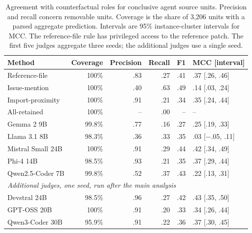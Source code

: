 \documentclass[a4paper,fleqn]{cas-sc}
\begin{document}
\begin{table}[pos=htbp]
\caption{Agreement with counterfactual roles for conclusive agent source units. Precision and recall concern removable units. Coverage is the share of 3,206 units with a parsed aggregate prediction. Intervals are 95\% instance-cluster intervals for MCC. The reference-file rule has privileged access to the reference patch. The first five judges aggregate three seeds; the additional judges use a single seed.}
\label{tab:comparisons}
\centering\small
\begin{tabular}{lrrrrl}
\toprule
Method & Coverage & Precision & Recall & F1 & MCC [interval] \\
\midrule
Reference-file & 100\% & .83 & .27 & .41 & .37 [.26, .46] \\
Issue-mention & 100\% & .40 & .63 & .49 & .14 [.03, .24] \\
Import-proximity & 100\% & .91 & .21 & .34 & .35 [.24, .44] \\
All-retained & 100\% & -- & .00 & -- & -- \\
\midrule
Gemma 2 9B & 99.8\% & .77 & .16 & .27 & .25 [.19, .33] \\
Llama 3.1 8B & 98.3\% & .36 & .33 & .35 & .03 [$-$.05, .11] \\
Mistral Small 24B & 100\% & .91 & .29 & .44 & .42 [.34, .49] \\
Phi-4 14B & 98.5\% & .93 & .21 & .35 & .37 [.29, .44] \\
Qwen2.5-Coder 7B & 99.8\% & .52 & .37 & .43 & .22 [.13, .31] \\
\midrule
\multicolumn{6}{l}{\emph{Additional judges, one seed, run after the main analysis}} \\
Devstral 24B & 98.5\% & .96 & .27 & .42 & .43 [.35, .50] \\
GPT-OSS 20B & 100\% & .91 & .20 & .33 & .34 [.26, .44] \\
Qwen3-Coder 30B & 95.9\% & .91 & .22 & .36 & .37 [.30, .45] \\
\bottomrule
\end{tabular}
\end{table}
\end{document}
